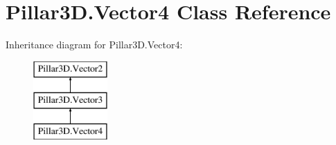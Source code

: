 \hypertarget{class_pillar3_d_1_1_vector4}{}\section{Pillar3\+D.\+Vector4 Class Reference}
\label{class_pillar3_d_1_1_vector4}
Inheritance diagram for Pillar3\+D.\+Vector4\+:\begin{figure}[H]
\begin{center}
\leavevmode
\includegraphics[height=3.000000cm]{class_pillar3_d_1_1_vector4}
\end{center}
\end{figure}
